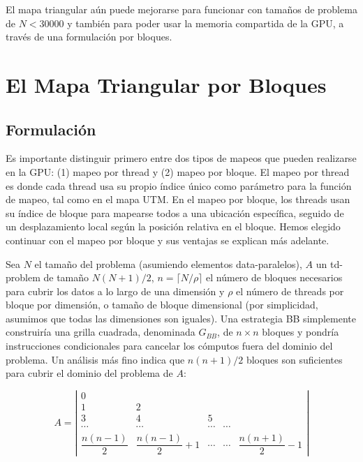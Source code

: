 \documentclass[twocolumn,10pt,a4paper]{article}
\begin{document}
El mapa triangular aún puede mejorarse para funcionar con tamaños de problema
de $N < 30000$ y también para poder usar la memoria compartida de la GPU,
a través de una formulación por bloques.

\section{El Mapa Triangular por Bloques}
\label{sec:blockwise}

\subsection{Formulación}

Es importante distinguir primero entre dos tipos de mapeos que pueden
realizarse en la GPU: (1) mapeo por thread y (2) mapeo por bloque. El mapeo
por thread es donde cada thread usa su propio índice único como parámetro para
la función de mapeo, tal como en el mapa UTM. En el mapeo por
bloque, los threads usan su índice de bloque para mapearse todos a una
ubicación específica, seguido de un desplazamiento local según la posición
relativa en el bloque. Hemos elegido continuar con el mapeo por bloque y sus
ventajas se explican más adelante.

Sea $N$ el tamaño del problema (asumiendo elementos data-paralelos), $A$ un
td-problem de tamaño $N(N+1)/2$, $n = \lceil N/\rho \rceil$ el número de
bloques necesarios para cubrir los datos a lo largo de una dimensión y $\rho$
el número de threads por bloque por dimensión, o tamaño de bloque dimensional
(por simplicidad, asumimos que todas las dimensiones son iguales). Una
estrategia BB simplemente construiría una grilla cuadrada, denominada $G_{BB}$,
de $n \times n$ bloques y pondría instrucciones condicionales para cancelar los
cómputos fuera del dominio del problema. Un análisis más fino indica que
$n(n+1)/2$ bloques son suficientes para cubrir el dominio del problema de $A$:

\begin{equation}
A = \left|
\begin{array}{ccccc}
0 & & & & \\
1 & 2 & & & \\
3 & 4 & 5 & & \\
\cdots & \cdots & \cdots & \cdots & \\
\dfrac{n(n-1)}{2} & \dfrac{n(n-1)}{2}+1 & \cdots & \cdots & \dfrac{n(n+1)}{2}-1
\end{array}
\right|
\label{eq:A}
\end{equation}
\end{document}
